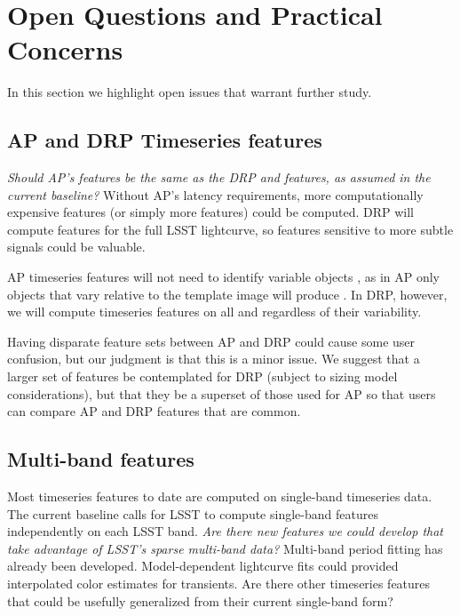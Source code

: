 \documentclass[DM,authoryear,toc]{lsstdoc}
\begin{document}



\section{Open Questions and Practical Concerns}

In this section we highlight open issues that warrant further study.

\subsection{AP and DRP Timeseries features}

\textit{Should AP's \DIAObject features be the same as the DRP \DIAObject and \Object features, as assumed in the current baseline?}
Without AP's latency requirements, more computationally expensive features (or simply more features) could be computed.
DRP will compute features for the full LSST lightcurve, so features sensitive to more subtle signals could be valuable.

AP timeseries features will not need to identify variable objects \citep[e.g.,][]{Pashchenko:18:OGLEClassification}, as in AP only objects that vary relative to the template image will produce \DIASources.
In DRP, however, we will compute timeseries features on all \DIAObjects and \Objects regardless of their variability.

Having disparate feature sets between AP and DRP could cause some user confusion, but our judgment is that this is a minor issue.
We suggest that a larger set of features be contemplated for DRP (subject to sizing model considerations), but that they be a superset of those used for AP so that users can compare AP and DRP features that are common.


\subsection{Multi-band features}

Most timeseries features to date are computed on single-band timeseries data.
The current baseline calls for LSST to compute single-band features independently on each LSST band.
\textit{Are there new features we could develop that take advantage of LSST's sparse multi-band data?}
Multi-band period fitting has already been developed.
Model-dependent lightcurve fits could provided interpolated color estimates for transients.
Are there other timeseries features that could be usefully generalized from their current single-band form?
\end{document}

